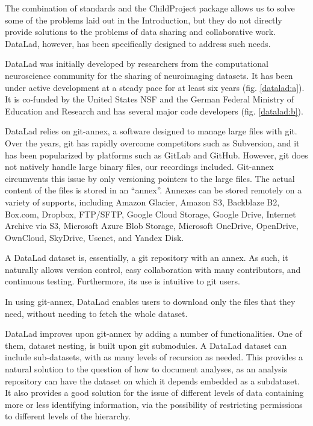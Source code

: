 \documentclass[smallextended]{svjour3}       %
\begin{document}
The combination of standards and the ChildProject package allows us to solve some of the problems laid out in the Introduction, but they do not directly provide solutions to the problems of data sharing and collaborative work. DataLad, however, has been specifically designed to address such needs.

DataLad \citep{datalad_paper} was initially developed by researchers from the computational neuroscience community for the sharing of neuroimaging datasets. It has been under active development at a steady pace for at least six years (fig. \ref{datalad:a}). It is co-funded by the United States NSF and the German Federal Ministry of Education and Research and has several major code developers (fig. \ref{datalad:b}).%

DataLad relies on git-annex, a software designed to manage large files with git. Over the years, git has rapidly overcome competitors such as Subversion, and it has been popularized by platforms such as GitLab and GitHub. However, git does not natively handle large binary files, our recordings included. Git-annex circumvents this issue by only versioning pointers to the large files. The actual content of the files is stored in an ``annex''. Annexes can be stored remotely on a variety of supports, including Amazon Glacier, Amazon S3, Backblaze B2, Box.com, Dropbox, FTP/SFTP, Google Cloud Storage, Google Drive, Internet Archive via S3, Microsoft Azure Blob Storage, Microsoft OneDrive, OpenDrive, OwnCloud, SkyDrive, Usenet, and Yandex Disk.

A DataLad dataset is, essentially, a git repository with an annex. As such, it naturally allows version control, easy collaboration with many contributors, and continuous testing. Furthermore, its use is intuitive to git users.

In using git-annex, DataLad enables users to download only the files that they need, without needing to fetch the whole dataset.

DataLad improves upon git-annex by adding a number of functionalities. One of them, dataset nesting, is built upon git submodules. A DataLad dataset can include sub-datasets, with as many levels of recursion as needed. This provides a natural solution to the question of how to document analyses, as an analysis repository can have the dataset on which it depends embedded as a subdataset. It also provides a good solution for the issue of different levels of data containing more or less identifying information, via the possibility of restricting permissions to different levels of the hierarchy.
\end{document}
